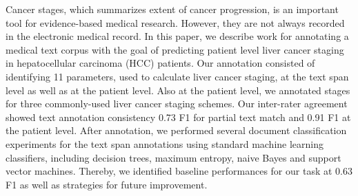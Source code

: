 Cancer stages, which summarizes extent of cancer progression, is an important tool for evidence-based medical research. However, they are not always recorded in the electronic medical record. In this paper, we describe work for annotating a medical text corpus with the goal of predicting patient level liver cancer staging in hepatocellular carcinoma (HCC) patients. Our annotation consisted of identifying 11 parameters, used to calculate liver cancer staging, at the text span level as well as at the patient level. Also at the patient level, we annotated stages for three commonly-used liver cancer staging schemes. Our inter-rater agreement showed text annotation consistency 0.73 F1 for partial text match and 0.91 F1 at the patient level. After annotation, we performed several document classification experiments for the text span annotations using standard machine learning classifiers, including decision trees, maximum entropy, naive Bayes and support vector machines. Thereby, we identified baseline performances for our task at 0.63 F1 as well as strategies for future improvement.
